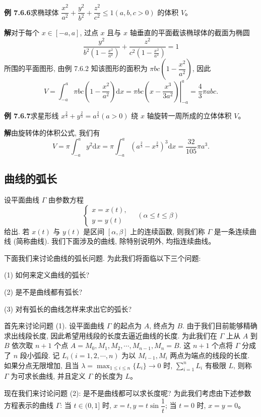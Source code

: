 \documentclass[UTF8, 12pt, fontset=fandol, oneside]{ctexart}
\begin{document}
\noindent\textbf{例 7.6.6}\quad 求椭球体 $\dfrac{x^2}{a^2}+\dfrac{y^2}{b^2}+\dfrac{z^2}{c^2}\leq1(a,b,c>0)$ 的体积 $V$。

\noindent\textbf{解}\quad 对于每个 $x\in[-a,a]$, 过点 $x$ 且与 $x$ 轴垂直的平面截该椭球体的截面为椭圆
\[
  \frac{y^2}{b^2\left(1-\frac{x^2}{a^2}\right)}
  +\frac{z^2}{c^2\left(1-\frac{x^2}{a^2}\right)}=1
\]
所围的平面图形, 由例 7.6.2 知该图形的面积为 $\pi bc\left(1-\dfrac{x^2}{a^2}\right)$, 因此
\[
  V=\int_{-a}^a \pi bc\left(1-\frac{x^2}{a^2}\right)\mathrm dx
  =\left.\pi bc\left(x-\frac{x^3}{3a^2}\right)\right|_{-a}^a
  =\frac{4}{3}\pi abc.
\]

\noindent\textbf{例 7.6.7}\quad 求星形线 $x^{\frac23}+y^{\frac23}=a^{\frac23}(a>0)$ 绕 $x$ 轴旋转一周所成的立体体积 $V$。

\noindent\textbf{解}\quad 由旋转体的体积公式, 我们有
\[
  V=\pi\int_{-a}^a y^2\mathrm dx
  =\pi\int_{-a}^a (a^{\frac23}-x^{\frac23})^3\mathrm dx
  =\frac{32}{105}\pi a^3.
\]

\subsection{曲线的弧长}

设平面曲线 $\Gamma$ 由参数方程
\[
  \begin{cases}
    x=x(t),\\
    y=y(t)
  \end{cases}
  \quad(\alpha\leq t\leq\beta)
\]
给出. 若 $x(t)$ 与 $y(t)$ 是区间 $[\alpha,\beta]$ 上的连续函数, 则我们称 $\Gamma$ 是一条连续曲线 (简称曲线). 我们下面涉及的曲线, 除特别说明外, 均指连续曲线。

下面我们来讨论曲线的弧长问题. 为此我们将面临以下三个问题:

(1) 如何来定义曲线的弧长?

(2) 是不是曲线都有弧长?

(3) 对有弧长的曲线怎样来求出它的弧长?

首先来讨论问题 (1). 设平面曲线 $\Gamma$ 的起点为 $A$, 终点为 $B$. 由于我们目前能够精确求出线段长度, 因此希望用线段的长度去逼近曲线的长度. 为此我们在 $\Gamma$ 上从 $A$ 到 $B$ 依次取 $n+1$ 个点 $A=M_0,M_1,M_2,\cdots,M_{n-1},M_n=B$. 这 $n+1$ 个点将 $\Gamma$ 分成了 $n$ 段小弧段. 记 $L_i(i=1,2,\cdots,n)$ 为以 $M_{i-1},M_i$ 两点为端点的线段的长度. 如果分点无限增加, 且当 $\lambda=\max_{1\leq i\leq n}\{L_i\}\to0$ 时, $\sum_{i=1}^n L_i$ 有极限 $L$, 则称 $\Gamma$ 为可求长曲线, 并且定义 $\Gamma$ 的长度为 $L$。

现在我们来讨论问题 (2): 是不是曲线都可以求长度呢? 为此我们考虑由下述参数方程表示的曲线 $\Gamma$: 当 $t\in(0,1]$ 时, $x=t,y=t\sin\dfrac{1}{t}$; 当 $t=0$ 时, $x=y=0$。
\end{document}
